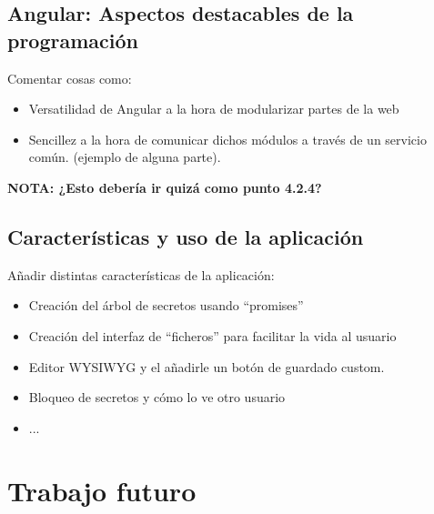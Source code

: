 \documentclass{\ClassPath/viu-tfm-template}
\begin{document}
\section{Angular: Aspectos destacables de la programación}
{\color{red} Comentar cosas como:

    \begin{itemize}
        \item Versatilidad de Angular a la hora de modularizar partes de la web
        \item Sencillez a la hora de comunicar dichos módulos a través de un servicio común. (ejemplo de alguna parte).
    \end{itemize}

{{\large \textbf{NOTA: ¿Esto debería ir quizá como punto 4.2.4?}}}
}




\section{Características y uso de la aplicación}
{\color{red} Añadir distintas características de la aplicación:

    \begin{itemize}
        \item Creación del árbol de secretos usando “promises”
        \item Creación del interfaz de “ficheros” para facilitar la vida al usuario
        \item Editor WYSIWYG y el añadirle un botón de guardado custom.
        \item Bloqueo de secretos y cómo lo ve otro usuario
        \item ...
    \end{itemize}
}

\chapter{Trabajo futuro}


\end{document}
